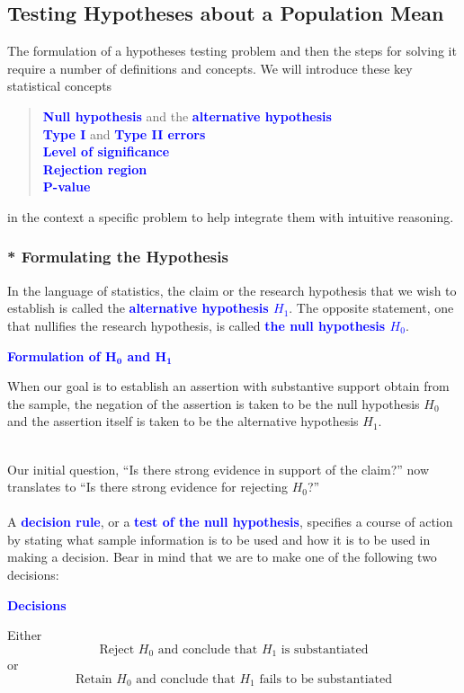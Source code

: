 \documentclass[12pt,a4paper]{article}
\begin{document}
\subsection{Testing Hypotheses about a Population Mean}
The formulation of a hypotheses testing problem and then the steps for solving it require a number of definitions and concepts. We will introduce these key statistical concepts \begin{quote}
	\textcolor{blue}{\bf Null hypothesis} and the \textcolor{blue}{\bf alternative hypothesis} \\
	\textcolor{blue}{\bf Type I} and \textcolor{blue}{\bf Type II errors} \\
	\textcolor{blue}{\bf Level of significance} \\
	\textcolor{blue}{\bf Rejection region} \\
	\textcolor{blue}{\bf P-value}
\end{quote} in the context a specific problem to help integrate them with intuitive reasoning.

\subsubsection*{* Formulating the Hypothesis}
In the language of statistics, the claim or the research hypothesis that we wish to establish is called the \textcolor{blue}{\bf alternative hypothesis $H_1$}. The opposite statement, one that nullifies the research hypothesis, is called \textcolor{blue}{\bf the null hypothesis $H_0$}.
\\
\begin{tcolorbox}[colback=white]\begin{center}
		\textcolor{blue}{\bf Formulation of $\boldsymbol{H_0}$ and $\boldsymbol{H_1}$}
	\end{center} When our goal is to establish an assertion with substantive support obtain from the sample, the negation of the assertion is taken to be the null hypothesis $H_0$ and the assertion itself is taken to be the alternative hypothesis $H_1$.
\end{tcolorbox}\ \\
Our initial question, ``Is there strong evidence in support of the claim?'' now
translates to ``Is there strong evidence for rejecting $H_0$?'' \\
\\
A \textcolor{blue}{\bf decision rule}, or a \textcolor{blue}{\bf test of the null hypothesis}, specifies a course of action by stating what sample information is to be used and how it is to be used in
making a decision. Bear in mind that we are to make one of the following two
decisions:
\begin{tcolorbox}[colback=white]\begin{center}
		\textcolor{blue}{\bf Decisions}
	\end{center} Either \[
	\text{Reject $H_0$ and conclude that $H_1$ is substantiated}
\] or \[
\text{Retain $H_0$ and conclude that $H_1$ fails to be substantiated}
\]
\end{tcolorbox}
\end{document}
